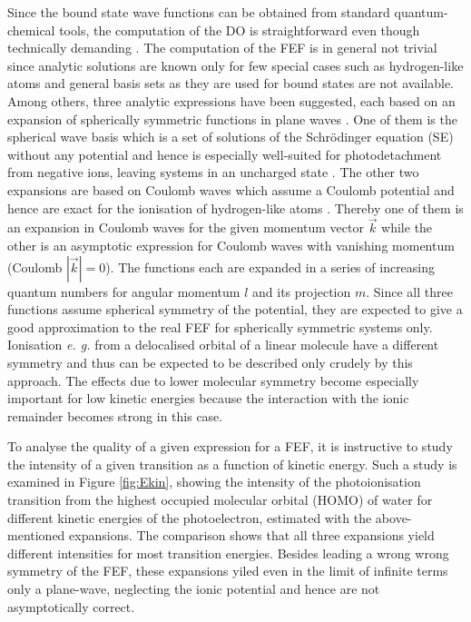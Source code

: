 Since the bound state wave functions can be obtained from standard quantum-chemical tools, the computation of the DO is straightforward even though technically demanding \cite{MAgg}.
The computation of the FEF is in general not trivial since analytic solutions are known only for few special cases such as hydrogen-like atoms \cite{Lifschitz} and general basis sets as they are used for bound states are not available.
Among others, three analytic expressions have been suggested, each based on an expansion of spherically symmetric functions in plane waves \cite{ezDyson}.
One of them is the spherical wave basis which is a set of solutions of the Schr\"odinger equation (SE) without any potential and hence is especially well-suited for photodetachment from negative ions, leaving systems in an uncharged state \cite{ezDyson, DO_TDDFT}.
The other two expansions are based on Coulomb waves which assume a Coulomb potential and hence are exact for the ionisation of hydrogen-like atoms \cite{Lifschitz}.
Thereby one of them is an expansion in Coulomb waves for the given momentum vector $\vec{k}$ while the other is an asymptotic expression for Coulomb waves with vanishing momentum (Coulomb $|\vec{k}|=0$).
The functions each are expanded in a series of increasing quantum numbers for angular momentum $l$ and its projection $m$.
Since all three functions assume spherical symmetry of the potential, they are expected to give a good approximation to the real FEF for spherically symmetric systems only.
Ionisation \textit{e. g.} from a delocalised orbital of a linear molecule have a different symmetry and thus can be expected to be described only crudely by this approach.
The effects due to lower molecular symmetry become especially important for low kinetic energies because the interaction with the ionic remainder becomes strong in this case. 

To analyse the quality of a given expression for a FEF, it is instructive to study the intensity of a given transition as a function of kinetic energy.
Such a study is examined in Figure \ref{fig:Ekin}, showing the intensity of the photoionisation transition from the highest occupied molecular orbital (HOMO) of water for different kinetic energies of the photoelectron, estimated with the above-mentioned expansions.
The comparison shows that all three expansions yield different intensities for most transition energies.
Besides leading a wrong wrong symmetry of the FEF, these expansions yiled even in the limit of infinite terms only a plane-wave, neglecting the ionic potential and hence are not asymptotically correct.

